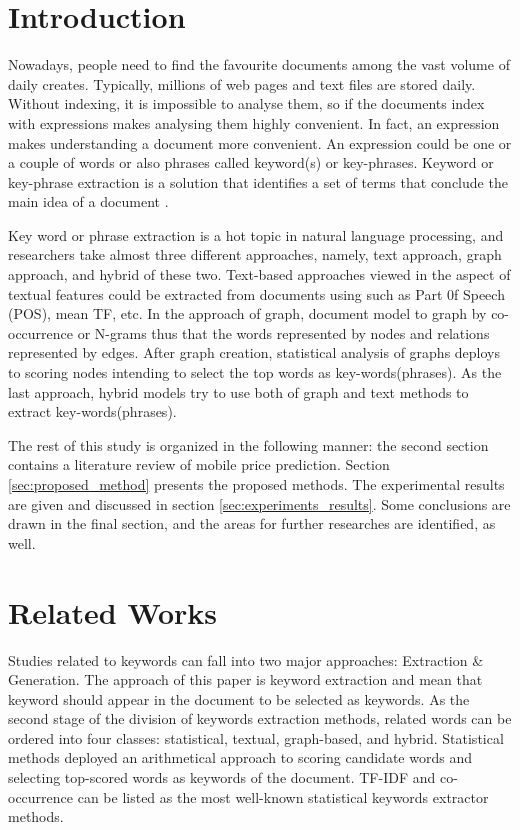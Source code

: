 \documentclass[3p]{elsarticle}
\begin{document}
\section{Introduction} \label{sec:Introduction}
Nowadays, people need to find the favourite documents among the vast volume of daily creates. Typically, millions of web pages and text files are stored daily. Without indexing, it is impossible to analyse them, so if the documents index with expressions makes analysing them highly convenient. In fact, an expression makes understanding a document more convenient. An expression could be one or a couple of words or also phrases called keyword(s) or key-phrases. Keyword or key-phrase extraction is a solution that identifies a set of terms that conclude the main idea of a document \cite{berry_kogan_2010}.

Key word or phrase extraction is a hot topic in natural language processing, and researchers take almost three different approaches, namely, text approach, graph approach, and hybrid of these two. Text-based approaches viewed in the aspect of textual features could be extracted from documents using such as Part 0f Speech (POS), mean TF, etc. In the approach of graph, document model to graph by co-occurrence or N-grams thus that the words represented by nodes and relations represented by edges. After graph creation, statistical analysis of graphs deploys to scoring nodes intending to select the top words as key-words(phrases). As the last approach, hybrid models try to use both of graph and text methods to extract key-words(phrases).



The rest of this study is organized in the following manner: the second section contains a literature review of mobile price prediction. Section \ref{sec:proposed_method} presents the proposed methods. The experimental results are given and discussed in section \ref{sec:experiments_results}. Some conclusions are drawn in the final section, and the areas for further researches are identified, as well.
\section{Related Works} \label{sec:related_works}
Studies related to keywords can fall into two major approaches: Extraction \& Generation. The approach of this paper is keyword extraction and mean that keyword should appear in the document to be selected as keywords. As the second stage of the division of keywords extraction methods, related words can be ordered into four classes: statistical, textual, graph-based, and hybrid. Statistical methods deployed an arithmetical approach to scoring candidate words and selecting top-scored words as keywords of the document. TF-IDF \cite{Lott2012} and co-occurrence \cite{matsuo2004keyword} can be listed as the most well-known statistical keywords extractor methods.
\end{document}
